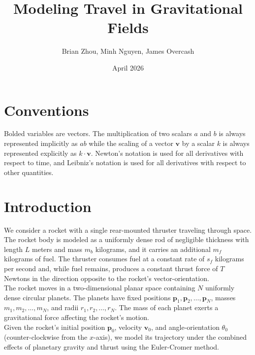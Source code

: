 \documentclass{article}
\title{Modeling Travel in Gravitational Fields}
\author{Brian Zhou, Minh Nguyen, James Overcash}
\date{April 2026}
\begin{document}
\maketitle

\section{Conventions}
Bolded variables are vectors. The multiplication of two scalars $a$ and $b$ is always represented implicitly as $ab$ while the scaling of a vector $\bm{v}$ by a scalar $k$ is always represented explicitly as $k \cdot \bm{v}$. Newton's notation is used for all derivatives with respect to time, and Leibniz's notation is used for all derivatives with respect to other quantities.

\section{Introduction}
We consider a rocket with a single rear-mounted thruster traveling through space. The rocket body is modeled as a uniformly dense rod of negligible thickness with length $L$ meters and mass $m_b$ kilograms, and it carries an additional $m_f$ kilograms of fuel. The thruster consumes fuel at a constant rate of $s_f$ kilograms per second and, while fuel remains, produces a constant thrust force of $T$ Newtons in the direction opposite to the rocket's vector-orientation.\\

The rocket moves in a two-dimensional planar space containing $N$ uniformly dense circular planets. The planets have fixed positions $\bm{p}_1,\bm{p}_2, \dots, \bm{p}_N$, masses $m_1, m_2, \dots, m_N$, and radii $r_1, r_2, \dots, r_N$. The mass of each planet exerts a gravitational force affecting the rocket's motion.\\

Given the rocket's initial position $\bm{p}_0$, velocity $\bm{v}_0$, and angle-orientation $\theta_0$ (counter-clockwise from the $x$-axis), we model its trajectory under the combined effects of planetary gravity and thrust using the Euler-Cromer method.
\end{document}
